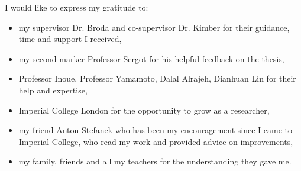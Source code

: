 
\cleardoublepage


\begin{acknowledgements}

I would like to express my gratitude to:

\begin{itemize}
 \item my supervisor Dr. Broda and co-supervisor Dr. Kimber for their guidance, time and support I received,
 \vspace*{3mm}
 \item my second marker Professor Sergot for his helpful feedback on the thesis,
 \vspace*{3mm}
 \item Professor Inoue, Professor Yamamoto, Dalal Alrajeh, Dianhuan Lin for their help and expertise,
 \vspace*{3mm}
  \item Imperial College London for the opportunity to grow as a researcher,
 \vspace*{3mm} 
  \vspace*{3mm}
  \item my friend Anton Stefanek who has been my encouragement since I came to Imperial College, who read my work and provided advice on improvements,
 \vspace*{3mm} 
 \item my family, friends and all my teachers for the understanding they gave me.
\end{itemize}

\end{acknowledgements}

